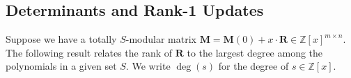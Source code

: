 \documentclass[a4paper, 11pt]{article}
\newcommand{\Z}{\mathbb{Z}}
\newcommand{\bM}{\bm{M}}
\newcommand{\bR}{\bm{R}}
\newcommand{\indet}{x}
\newcommand{\intvar}{a}
\newcommand{\polyring}{\Z[\indet]}
\newcommand{\polyS}{S}
\newcommand{\polyM}{\bM}
\newtheorem{lemma}{Lemma}
\begin{document}
%	
%		
	\subsection{Determinants and Rank-1 Updates}
	Suppose we have a totally $\polyS$-modular matrix $\polyM = \bM(0) + \indet\cdot \bR\in\polyring^{m\times n}$. The following result relates the rank of $\bR$ to the largest degree among the polynomials in a given set $\polyS$. We write $\deg(s)$ for the degree of $s\in \polyring$.
	
\end{document}
